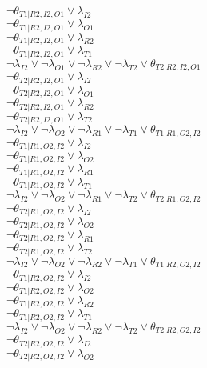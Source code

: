 $\neg\theta_{T1|R2,I2,O1} \vee \lambda_{I2}$\\
$\neg\theta_{T1|R2,I2,O1} \vee \lambda_{O1}$\\
$\neg\theta_{T1|R2,I2,O1} \vee \lambda_{R2}$\\
$\neg\theta_{T1|R2,I2,O1} \vee \lambda_{T1}$\\
$\neg\lambda_{I2} \vee \neg\lambda_{O1} \vee \neg\lambda_{R2} \vee \neg\lambda_{T2} \vee \theta_{T2|R2,I2,O1}$\\
$\neg\theta_{T2|R2,I2,O1} \vee \lambda_{I2}$\\
$\neg\theta_{T2|R2,I2,O1} \vee \lambda_{O1}$\\
$\neg\theta_{T2|R2,I2,O1} \vee \lambda_{R2}$\\
$\neg\theta_{T2|R2,I2,O1} \vee \lambda_{T2}$\\
$\neg\lambda_{I2} \vee \neg\lambda_{O2} \vee \neg\lambda_{R1} \vee \neg\lambda_{T1} \vee \theta_{T1|R1,O2,I2}$\\
$\neg\theta_{T1|R1,O2,I2} \vee \lambda_{I2}$\\
$\neg\theta_{T1|R1,O2,I2} \vee \lambda_{O2}$\\
$\neg\theta_{T1|R1,O2,I2} \vee \lambda_{R1}$\\
$\neg\theta_{T1|R1,O2,I2} \vee \lambda_{T1}$\\
$\neg\lambda_{I2} \vee \neg\lambda_{O2} \vee \neg\lambda_{R1} \vee \neg\lambda_{T2} \vee \theta_{T2|R1,O2,I2}$\\
$\neg\theta_{T2|R1,O2,I2} \vee \lambda_{I2}$\\
$\neg\theta_{T2|R1,O2,I2} \vee \lambda_{O2}$\\
$\neg\theta_{T2|R1,O2,I2} \vee \lambda_{R1}$\\
$\neg\theta_{T2|R1,O2,I2} \vee \lambda_{T2}$\\
$\neg\lambda_{I2} \vee \neg\lambda_{O2} \vee \neg\lambda_{R2} \vee \neg\lambda_{T1} \vee \theta_{T1|R2,O2,I2}$\\
$\neg\theta_{T1|R2,O2,I2} \vee \lambda_{I2}$\\
$\neg\theta_{T1|R2,O2,I2} \vee \lambda_{O2}$\\
$\neg\theta_{T1|R2,O2,I2} \vee \lambda_{R2}$\\
$\neg\theta_{T1|R2,O2,I2} \vee \lambda_{T1}$\\
$\neg\lambda_{I2} \vee \neg\lambda_{O2} \vee \neg\lambda_{R2} \vee \neg\lambda_{T2} \vee \theta_{T2|R2,O2,I2}$\\
$\neg\theta_{T2|R2,O2,I2} \vee \lambda_{I2}$\\
$\neg\theta_{T2|R2,O2,I2} \vee \lambda_{O2}$\\
